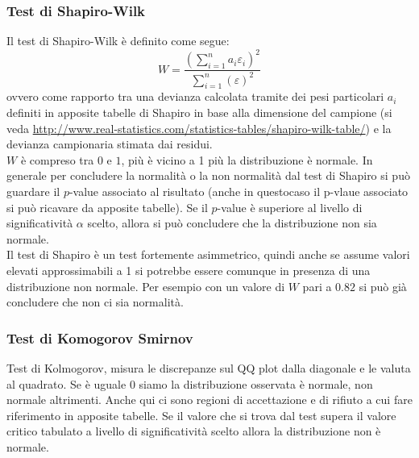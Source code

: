 \subsubsection{Test di Shapiro-Wilk}
Il test di Shapiro-Wilk è definito come segue:
\begin{equation}
W = \frac{(\sum_{i=1}^{n} a_i \varepsilon_i)^2}{\sum_{i=1}^{n} (\varepsilon)^2}
\end{equation}
ovvero come rapporto tra una devianza calcolata tramite dei pesi particolari $a_i$ definiti in apposite tabelle di Shapiro in base alla dimensione del campione (si veda \url{http://www.real-statistics.com/statistics-tables/shapiro-wilk-table/}) e la devianza campionaria stimata dai residui.\\
$W$ è compreso tra $0$ e $1$, più è vicino a 1 più la distribuzione è normale. In generale per concludere la normalità o la non normalità dal test di Shapiro si può guardare il $p$-value associato al risultato (anche in questocaso il p-vlaue associato si può ricavare da apposite tabelle). Se il $p$-value è superiore al livello di significatività $\alpha$ scelto, allora si può concludere che la distribuzione non sia normale.\\
Il test di Shapiro è un test fortemente asimmetrico, quindi anche se assume valori elevati approssimabili a 1 si potrebbe essere comunque in presenza di una distribuzione non normale. Per esempio con un valore di $W$ pari a $0.82$ si può già concludere che non ci sia normalità.

\subsubsection{Test di Komogorov Smirnov}
Test di Kolmogorov, misura le discrepanze sul QQ plot dalla diagonale e le valuta al quadrato. Se è uguale 0 siamo la distribuzione osservata è normale, non normale altrimenti. Anche qui ci sono regioni di accettazione e di rifiuto a cui fare riferimento in apposite tabelle. Se il valore che si trova dal test supera il valore critico tabulato a livello di significatività scelto allora la distribuzione non è normale.

